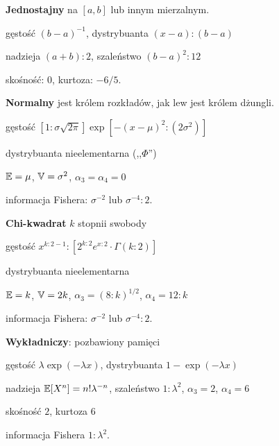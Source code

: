 

\renewcommand{\footrulewidth}{0.4pt}

\begin{multicols*}{3}
\textbf{Jednostajny} \dotfill na $[a,b]$ lub innym mierzalnym.
\begin{enumx}
\item gęstość $(b-a)^{-1}$, dystrybuanta $(x-a) : (b-a)$
\item nadzieja $(a + b) : 2$, szaleństwo $(b-a)^2 : 12$
\item skośność: $0$, kurtoza: $- 6  / 5$.
\end{enumx}

\textbf{Normalny} jest królem rozkładów, jak lew jest królem dżungli.
\begin{enumx}
\item gęstość $[1 : \sigma \sqrt{2\pi}] \exp [- (x- \mu)^2 : (2 \sigma^2)]$
\item dystrybuanta nieelementarna (,,$\Phi$'')
\item $\mathbb{E} = \mu$, $\mathbb{V} = \sigma^2$, $\alpha_3 = \alpha_4 = 0$
\item informacja Fishera: $\sigma^{-2}$ lub $\sigma^{-4}: 2$.
\end{enumx}

\textbf{Chi-kwadrat} \dotfill $k$ stopnii swobody
\begin{enumx}
\item gęstość $x^{k:2 - 1} : [2^{k:2} e^{x:2} \cdot \Gamma(k:2)]$
\item dystrybuanta nieelementarna
\item $\mathbb{E} = k$, $\mathbb{V} = 2k$, $\alpha_3 = (8:k)^{1/2}$, $\alpha_4 = 12 : k$
\item informacja Fishera: $\sigma^{-2}$ lub $\sigma^{-4}: 2$.
\end{enumx}

\textbf{Wykładniczy}: \dotfill pozbawiony pamięci
\begin{enumx}
\item gęstość $\lambda \exp(- \lambda x)$, dystrybuanta $1 - \exp (- \lambda x)$
\item nadzieja $\mathbb{E}[X^n] = n! \lambda^{-n}$, szaleństwo $1 : \lambda^2$, $\alpha_3 = 2$, $\alpha_4 = 6$
\item skośność $2$, kurtoza $6$
\item informacja Fishera $1 : \lambda^2$.
\end{enumx}


\end{multicols*}
